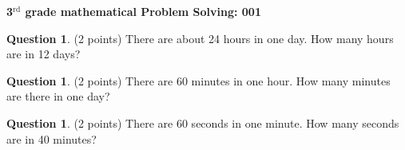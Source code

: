 \documentclass[12pt]{article}
\theoremstyle{definition}
\newtheorem{question}[thm]{Question}
\begin{document}
	\begin{center}
	{\LARGE \textbf{3$^{\textrm{rd}}$ grade mathematical Problem Solving: 001}}\\
		\vspace{.6cm}
	\end{center}
	
\begin{question}
	(2 points) There are about 24 hours in one day. How many hours are in 12 days?
\end{question}

\vspace{2.5cm}

\begin{question}
	(2 points) There are 60 minutes in one hour. How many minutes are there in one day?
\end{question}

\vspace{2.5cm}
 
\begin{question}
	(2 points) There are 60 seconds in one minute. How many seconds are in 40 minutes?
\end{question}

\vspace{2.5cm}
\end{document}
